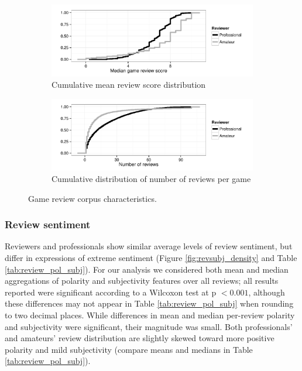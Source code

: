 \documentclass[letterpaper]{article}
\begin{document}
\begin{figure}[tb]
\centering


\begin{subfigure}[b]{\linewidth}
\includegraphics[width=\linewidth]{./console_games_scoremedian_ecdf}
\caption{Cumulative mean review score distribution}
\label{fig:game_score}
\end{subfigure}
\begin{subfigure}[b]{\linewidth}
\includegraphics[width=\linewidth]{./console_games_numreviews_ecdf}
\caption{Cumulative distribution of number of reviews per game}
\label{fig:game_reviewnum}
\end{subfigure}
\caption{Game review corpus characteristics.}
\label{fig:revscore_console}
\end{figure}

\subsubsection{Review sentiment}
Reviewers and professionals show similar average levels of review sentiment, but differ in expressions of extreme sentiment (Figure \ref{fig:revsubj_density} and Table \ref{tab:review_pol_subj}).
For our analysis we considered both mean and median aggregations of polarity and subjectivity features over all reviews; all results reported were significant according to a Wilcoxon test at p $< 0.001$, although these differences may not appear in Table \ref{tab:review_pol_subj} when rounding to two decimal places. While differences in mean and median per-review polarity and subjectivity were significant, their magnitude was small.
Both professionals' and amateurs' review distribution are slightly skewed toward more positive polarity and mild subjectivity (compare means and medians in Table \ref{tab:review_pol_subj}). 
\end{document}
